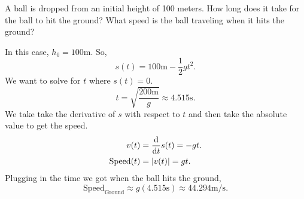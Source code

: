 \begin{example}
	A ball is dropped from an initial height of 100 meters.
	How long does it take for the ball to hit the ground?
	What speed is the ball traveling when it hits the ground?
\end{example}
In this case, $h_0 = 100\text{m}$.
So,
\begin{equation*}
	s(t) = 100\text{m} - \frac{1}{2}gt^2.
\end{equation*}
We want to solve for $t$ where $s(t)=0$.
\begin{equation*}
	t = \sqrt{\frac{200\text{m}}{g}} \approx 4.515\text{s}.
\end{equation*}
We take take the derivative of $s$ with respect to $t$ and then take the absolute value to get the speed.
\begin{align*}
	v(t) &= \frac{\mathrm{d} }{\mathrm{d} t}s(t) = -gt. \\
	\text{Speed}(t) &= \lvert v(t) \rvert = gt.
\end{align*}
Plugging in the time we got when the ball hits the ground,
\begin{equation*}
	\text{Speed}_{\text{Ground}} \approx g(4.515\text{s}) \approx 44.294\text{m/s}.
\end{equation*}